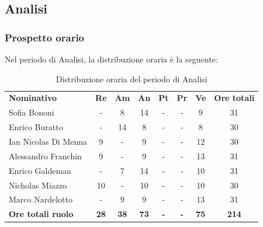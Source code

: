 \documentclass[../piano-di-progetto.tex]{subfiles}
\begin{document}
  \subsection{Analisi}

  \subsubsection{Prospetto orario}
  Nel periodo di Analisi, la distribuzione oraria è la seguente:
  \begin{table}[H]
    \centering
    \begin{tabular}{lccccccc}
      \rowcolor{lightgray}
      \textbf{Nominativo}        & \textbf{Re} & \textbf{Am}  & \textbf{An} & \textbf{Pt}  & \textbf{Pr}   & \textbf{Ve} & \textbf{Ore totali} \\
      Sofia Bononi              & -          & 8          & 14          & -          & -          & 9          & 31          \\
      Enrico Buratto            & -          & 14         & 8          & -          & -          & 8          & 30          \\
      Ian Nicolas Di Menna      & 9          & -          & 9          & -          & -          & 12          & 30          \\
      Alessandro Franchin       & 9          & -          & 9          & -          & -          & 13          & 31         \\
      Enrico Galdeman           & -          & 7          & 14          & -          & -          & 10          & 31          \\
      Nicholas Miazzo           & 10         & -          & 10          & -          & -          & 10         & 30         \\
      Marco Nardelotto          & -          & 9          & 9         & -          & -          & 13          & 31          \\
      \textbf{Ore totali ruolo} & \textbf{28} & \textbf{38} & \textbf{73} & \textbf{-} & \textbf{-} & \textbf{75} & \textbf{214}
    \end{tabular}
    \caption{Distribuzione oraria del periodo di Analisi}
  \end{table}
\end{document}
